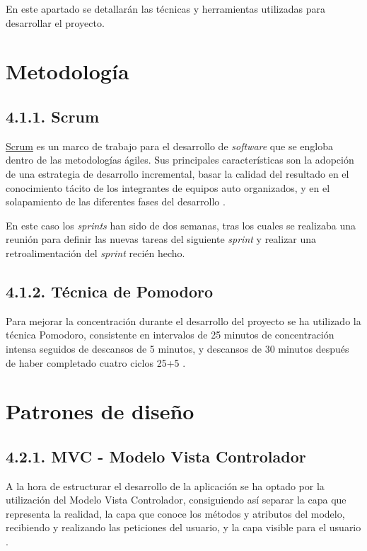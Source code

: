 
En este apartado se detallarán las técnicas y herramientas utilizadas para desarrollar el proyecto.

\section{Metodología}

\subsection{4.1.1. Scrum}

\href{https://proyectosagiles.org/que-es-scrum/}{Scrum} es un marco de trabajo para el desarrollo de \textit{software} que se engloba dentro de las metodologías ágiles. Sus principales características son la adopción de una estrategia de desarrollo incremental, basar la calidad del resultado en el conocimiento tácito de los integrantes de equipos auto organizados, y en el solapamiento de las diferentes fases del desarrollo \cite{wiki:scrum}.

En este caso los \textit{sprints} han sido de dos semanas, tras los cuales se realizaba una reunión para definir las nuevas tareas del siguiente \textit{sprint} y realizar una retroalimentación del \textit{sprint} recién hecho.

\subsection{4.1.2. Técnica de Pomodoro}

Para mejorar la concentración durante el desarrollo del proyecto se ha utilizado la técnica Pomodoro, consistente en intervalos de 25 minutos de concentración intensa seguidos de descansos de 5 minutos, y descansos de 30 minutos después de haber completado cuatro ciclos 25+5 \cite{wiki:pomodoro}.

\section{Patrones de diseño}

\subsection{4.2.1. MVC - Modelo Vista Controlador}

A la hora de estructurar el desarrollo de la aplicación se ha optado por la utilización del Modelo Vista Controlador, consiguiendo así separar la capa que representa la realidad, la capa que conoce los métodos y atributos del modelo, recibiendo y realizando las peticiones del usuario, y la capa visible para el usuario \cite{web:patronDis}.


